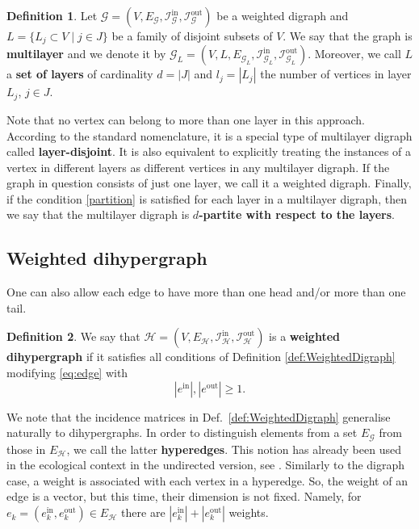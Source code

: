 \documentclass[a4paper,12pt]{article}
\theoremstyle{definition}
\newtheorem{definition}{Definition}
\theoremstyle{remark}
\newcommand{\mG}{\mathcal{G}}
\newcommand{\mH}{\mathcal{H}}
\newcommand{\EG}{E_{\mathcal{G}}}
\newcommand{\EH}{E_{\mathcal{H}}}
\newcommand{\tin}{\mathrm{in}}
\newcommand{\out}{\mathrm{out}}
\newcommand{\inci}{\mathcal{I}^{\tin}}
\newcommand{\inco}{\mathcal{I}^{\out}}
\begin{document}
\begin{definition}\label{def:multi_layer_dirgaph}
  Let $\mathcal{G}=(V, E_{\mG},\inci_{\mG},\inco_{\mG})$ be a weighted digraph and $L=\{L_j\subset V\; | \; j \in J\}$ be a family of disjoint subsets of $V$. We say that the graph is \textbf{multilayer} and we denote it by $\mG_L= (V,L, E_{\mG_L},\inci_{\mG_L},\inco_{\mG_L})$. Moreover, we call $L$ a \textbf{set of layers} of cardinality $d=|J|$ and $l_j=|L_j|$ the number of vertices in layer $L_j$, $j\in J$.
 
\end{definition}

Note that no vertex can belong to more than one layer in this approach. According to the standard nomenclature, it is a special type of multilayer digraph called \textbf{layer-disjoint}. It is also equivalent to explicitly treating the instances of a vertex in different layers as different vertices in any multilayer digraph. If the graph in question consists of just one layer, we call it a weighted digraph.
Finally, if the condition \eqref{partition} is satisfied for each layer in a multilayer digraph, then we say that the multilayer digraph is \textbf{$d$-partite with respect to the layers}.


\subsection{Weighted dihypergraph}\label{sec:H_graph}
One can also allow each edge to have more than one head and/or more than one tail. 
\begin{definition}\label{def:dihypergraph}
We say that  $\mH = (V,\EH,\inci_\mH,\inco_\mH)$ is a \textbf{weighted dihypergraph} if it satisfies all conditions of Definition \ref{def:WeightedDigraph} modifying \eqref{eq:edge} with 
\begin{equation}\label{eq:edge2}
        |e^{\tin}|,|e^{\out}|\geq 1.
        \end{equation}
\end{definition}
We note that the incidence matrices in Def.~\ref{def:WeightedDigraph} generalise naturally to dihypergraphs. In order to distinguish elements from a set $\EG$ from those in $\EH$, we call the latter \textbf{hyperedges}. This notion has already been used in the ecological context in the undirected version, see \protect\cite{Bretto2013}. Similarly to the digraph case, a weight is associated with each vertex in a hyperedge. So, the weight of an edge is a vector, but this time, their dimension is not fixed. Namely, for $e_k=(e_k^{\mathrm{in}},e_k^{\mathrm{out}}) \in \EH$ there are $|e_k^{\mathrm{in}}|+|e_k^{\mathrm{out}}|$ weights.
\end{document}
